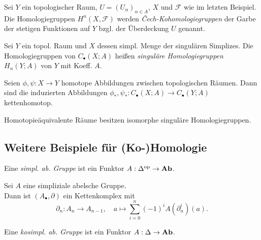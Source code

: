 \documentclass{cheat-sheet}
\newcommand{\CC}[1]{{#1}_{\bullet}} %
\begin{document}

\begin{bsp}
  Sei $Y$ ein topologischer Raum, $U = (U_\alpha)_{\alpha \in A}$, $X$ und $\mathcal{F}$ wie im letzten Beispiel. Die Homologiegruppen $H^n(X, \mathcal{F})$ werden \emph{Čech-Kohomologiegruppen} der Garbe der stetigen Funktionen auf $Y$ bzgl. der Überdeckung $U$ genannt.
\end{bsp}

\begin{defn}
  Sei $Y$ ein topol. Raum und $X$ dessen simpl. Menge der singulären Simplizes.
  Die Homologiegruppen von $\CC{C}(X; A)$ heißen \emph{singuläre Homologiegruppen} $H_n(Y; A)$ von $Y$ mit Koeff. $A$.
\end{defn}

\begin{prop}
  Seien $\phi, \psi : X \to Y$ homotope Abbildungen zwischen topologischen Räumen. Dann sind die induzierten Abbildungen $\phi_*, \psi_* : \CC{C}(X; A) \to \CC{C}(Y; A)$ kettenhomotop.
\end{prop}

\begin{kor}
  Homotopieäquivalente Räume besitzen isomorphe singuläre Homologiegruppen.
\end{kor}


\subsection{Weitere Beispiele für (Ko-)Homologie}



\begin{defn}
  Eine \emph{simpl. ab. Gruppe} ist ein Funktor
  $A : \Delta^{\mathrm{op}} \to \mathbf{Ab}$.
\end{defn}

\begin{defn}
  Sei $A$ eine simpliziale abelsche Gruppe. \\
  Dann ist $(A_\bullet, \partial)$ ein Kettenkomplex mit
  \[
    \partial_n : A_n \to A_{n-1}, \quad
    a \mapsto \sum_{i=0}^n (-1)^i A(\partial_n^i)(a).
  \]
\end{defn}

\begin{defn}
  Eine \emph{kosimpl. ab. Gruppe} ist ein Funktor
  $A : \Delta \to \mathbf{Ab}$.
\end{defn}
\end{document}
